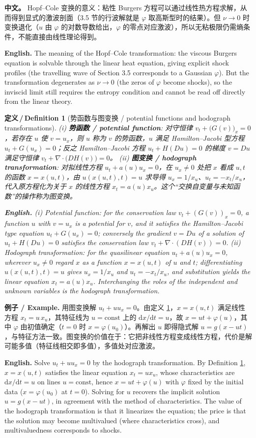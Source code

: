 \documentclass[UTF8,11pt,a4paper]{ctexart}
\newcommand{\APS}[2]{\par\noindent\textbf{中文。} #1\par\noindent\textbf{English.} #2\par\smallskip}
\newcommand{\EN}[1]{\par\noindent \textbf{English.} #1\par}
\newcommand{\EX}[2]{\par\noindent \textbf{例子 / Example.} #1\par\EN{#2}}
\newtheorem{definition}{定义\,/\,Definition}[section]
\newcommand{\dd}{\mathrm{d}}
\begin{document}
\APS{Hopf--Cole 变换的意义：粘性 Burgers 方程可以通过线性热方程求解，从而得到显式的激波剖面（3.5 节的行波解就是 $\varphi$ 取高斯型时的结果）。但 $\nu\to0$ 时变换退化（$u$ 由 $\varphi$ 的对数导数给出，$\varphi$ 的零点对应激波），所以无粘极限仍需熵条件，不能直接由线性理论得到。}{The meaning of the Hopf--Cole transformation: the viscous Burgers equation is solvable through the linear heat equation, giving explicit shock profiles (the travelling wave of Section 3.5 corresponds to a Gaussian $\varphi$). But the transformation degenerates as $\nu\to0$ (the zeros of $\varphi$ become shocks), so the inviscid limit still requires the entropy condition and cannot be read off directly from the linear theory.}

\begin{definition}[势函数与图变换 / potential functions and hodograph transformations]\label{def:potential}
(i) \textbf{势函数 / potential function}: 对守恒律 $v_t+\bigl(G(v)\bigr)_x=0$，若存在 $u$ 使 $v=u_x$，则 $u$ 称为 $v$ 的势函数，$u$ 满足 Hamilton--Jacobi 型方程 $u_t+G(u_x)=0$；反之 Hamilton--Jacobi 方程 $u_t+H(Du)=0$ 的梯度 $v=Du$ 满足守恒律 $v_t+\nabla\cdot\bigl(DH(v)\bigr)=0$。
(ii) \textbf{图变换 / hodograph transformation}: 对拟线性方程 $u_t+a(u)u_x=0$，在 $u_x\ne0$ 处把 $x$ 看成 $u,t$ 的函数 $x=x(u,t)$，由 $u(x(u,t),t)=u$ 求导得 $u_x=1/x_u$、$u_t=-x_t/x_u$，代入原方程化为关于 $x$ 的线性方程 $x_t=a(u)x_u$。这个``交换自变量与未知函数''的操作称为图变换。
\EN{(i) Potential function: for the conservation law $v_t+(G(v))_x=0$, a function $u$ with $v=u_x$ is a potential for $v$, and it satisfies the Hamilton--Jacobi type equation $u_t+G(u_x)=0$; conversely the gradient $v=Du$ of a solution of $u_t+H(Du)=0$ satisfies the conservation law $v_t+\nabla\cdot(DH(v))=0$. (ii) Hodograph transformation: for the quasilinear equation $u_t+a(u)u_x=0$, wherever $u_x\ne0$ regard $x$ as a function $x=x(u,t)$ of $u$ and $t$; differentiating $u(x(u,t),t)=u$ gives $u_x=1/x_u$ and $u_t=-x_t/x_u$, and substitution yields the linear equation $x_t=a(u)x_u$. Interchanging the roles of the independent and unknown variables is the hodograph transformation.}
\end{definition}

\EX{用图变换解 $u_t+uu_x=0$。由定义 \ref{def:potential}，$x=x(u,t)$ 满足线性方程 $x_t=u\,x_u$，其特征线为 $u=\mathrm{const}$ 上的 $\dd x/\dd t=u$，故 $x=ut+\varphi(u)$，其中 $\varphi$ 由初值确定（$t=0$ 时 $x=\varphi(u_0)$）。再解出 $u$ 即得隐式解 $u=g(x-ut)$，与特征方法一致。图变换的价值在于：它把非线性方程变成线性方程，代价是解可能多值（特征线相交即多值），多值处对应激波。}{Solve $u_t+uu_x=0$ by the hodograph transformation. By Definition \ref{def:potential}, $x=x(u,t)$ satisfies the linear equation $x_t=ux_u$, whose characteristics are $\dd x/\dd t=u$ on lines $u=\mathrm{const}$, hence $x=ut+\varphi(u)$ with $\varphi$ fixed by the initial data ($x=\varphi(u_0)$ at $t=0$). Solving for $u$ recovers the implicit solution $u=g(x-ut)$, in agreement with the method of characteristics. The value of the hodograph transformation is that it linearizes the equation; the price is that the solution may become multivalued (where characteristics cross), and multivaluedness corresponds to shocks.}
\end{document}
